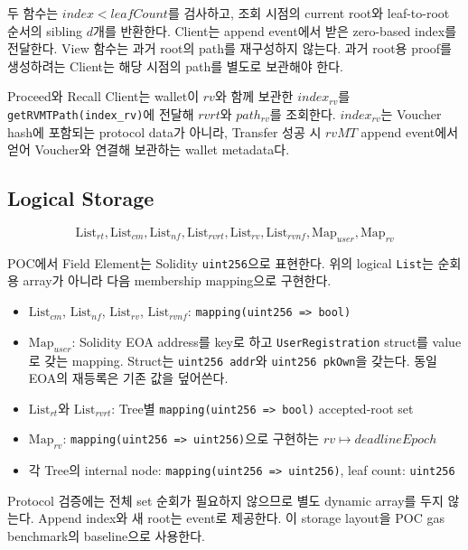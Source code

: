 \documentclass[11pt,a4paper]{extarticle}
\newcommand{\List}[1]{\mathrm{List}_{#1}}
\newcommand{\Map}[1]{\mathrm{Map}_{#1}}
\begin{document}
두 함수는 $index<leafCount$를 검사하고, 조회 시점의 current root와 leaf-to-root 순서의
sibling $d$개를 반환한다. Client는 append event에서 받은 zero-based index를 전달한다.
View 함수는 과거 root의 path를 재구성하지 않는다. 과거 root용 proof를 생성하려는
Client는 해당 시점의 path를 별도로 보관해야 한다.

Proceed와 Recall Client는 wallet이 $rv$와 함께 보관한 $index_{rv}$를
\texttt{getRVMTPath(index\_rv)}에 전달해 $rvrt$와 $path_{rv}$를 조회한다.
$index_{rv}$는 Voucher hash에 포함되는 protocol data가 아니라, Transfer 성공 시
$rvMT$ append event에서 얻어 Voucher와 연결해 보관하는 wallet metadata다.

\subsection{Logical Storage}

\[
\List{rt},\List{cm},\List{nf},
\List{rvrt},\List{rv},\List{rvnf},\Map{user},\Map{rv}
\]

POC에서 Field Element는 Solidity \texttt{uint256}으로 표현한다. 위의 logical
\texttt{List}는 순회용 array가 아니라 다음 membership mapping으로 구현한다.

\begin{itemize}
  \item $\List{cm}$, $\List{nf}$, $\List{rv}$, $\List{rvnf}$:
        \texttt{mapping(uint256 => bool)}
  \item $\Map{user}$: Solidity EOA address를 key로 하고
        \texttt{UserRegistration} struct를 value로 갖는 mapping. Struct는
        \texttt{uint256 addr}와 \texttt{uint256 pkOwn}을 갖는다. 동일 EOA의 재등록은
        기존 값을 덮어쓴다.
  \item $\List{rt}$와 $\List{rvrt}$: Tree별
        \texttt{mapping(uint256 => bool)} accepted-root set
  \item $\Map{rv}$: \texttt{mapping(uint256 => uint256)}으로 구현하는
        $rv\mapsto deadlineEpoch$
  \item 각 Tree의 internal node: \texttt{mapping(uint256 => uint256)}, leaf count:
        \texttt{uint256}
\end{itemize}

Protocol 검증에는 전체 set 순회가 필요하지 않으므로 별도 dynamic array를 두지 않는다.
Append index와 새 root는 event로 제공한다. 이 storage layout을 POC gas benchmark의
baseline으로 사용한다.
\end{document}
